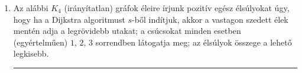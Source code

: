 \documentclass[a4paper,12pt]{article}
\begin{document}
\begin{enumerate}
        \item Az alábbi $K_4$ (irányítatlan) gráfok éleire írjunk pozitív egész élsúlyokat úgy, hogy ha a Dijkstra algoritmust $s$-ből indítjuk, akkor a vastagon szedett élek mentén adja a legrövidebb utakat; a csúcsokat minden esetben (egyértelműen) $1$, $2$, $3$ sorrendben látogatja meg; az élsúlyok összege a lehető legkisebb.
        \begin{figure}[!h]
            \centering
            \begin{subfigure}{0.15\textwidth}
                \centering
                
            \end{subfigure}
            \begin{subfigure}{0.15\textwidth}
                \centering
                
            \end{subfigure}
            \begin{subfigure}{0.15\textwidth}
                \centering
                
            \end{subfigure}
            \begin{subfigure}{0.15\textwidth}
                \centering
                
            \end{subfigure}
            \begin{subfigure}{0.15\textwidth}
                \centering
                
            \end{subfigure}
            \begin{subfigure}{0.15\textwidth}
                \centering
                
            \end{subfigure}
        \end{figure}

        

        \hrule


\end{enumerate}
\end{document}
